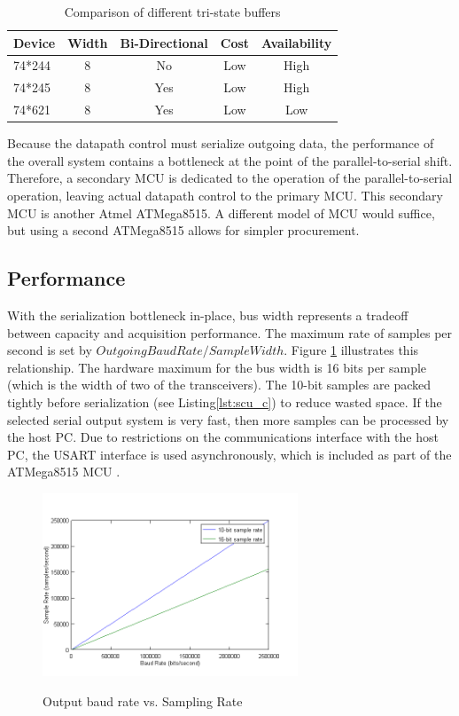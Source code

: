 \begin{table}[bhp]
\caption[Buffer Comparison]{Comparison of different tri-state buffers}
\small
\begin{center}
\begin{tabular}{l| c c c c}
\setlength{\tabcolsep}{1pt}
	Device & Width & Bi-Directional & Cost & Availability \\\hline
	74*244 & 8     & No             & Low  & High\\
	74*245 & 8     & Yes            & Low  & High\\
	74*621 & 8     & Yes            & Low  & Low
\end{tabular}
\end{center}
\label{tab:buffer comparison}
\end{table}

Because the datapath control must serialize outgoing data, the performance
of the overall system contains a bottleneck at the point of the 
parallel-to-serial shift. Therefore, a secondary MCU is dedicated to
the operation of the parallel-to-serial operation, leaving actual datapath 
control to the primary MCU. This secondary MCU is another Atmel ATMega8515. A
different model of MCU would suffice, but using a second ATMega8515 allows  
for simpler procurement.

\subsection{Performance}
With the serialization bottleneck in-place, bus width represents a tradeoff 
between capacity and acquisition performance. The maximum rate of samples per
second is set by ${Outgoing Baud Rate}/{Sample Width}$. Figure \ref{fig:baud rates and sample} 
illustrates this relationship. The hardware maximum for the bus width is 16 bits
per sample (which is the width of two of the transceivers). The 10-bit samples
are packed tightly before serialization (see Listing\ref{lst:scu_c}) to reduce
 wasted space. If the selected serial output system is very fast, then more 
samples can be processed by the host PC. Due to restrictions on the 
communications interface with the host PC, the USART  interface 
is used asynchronously, which is included as part of the ATMega8515 MCU
\cite{ds:ATMEGA8515}.

\begin{figure}[hbp]
\caption[Baud Rate and Samples]{Output baud rate vs. Sampling Rate\cite{ds:ATMEGA8515}}
\includegraphics[width=3in]{baud_rate.png}
\label{fig:baud rates and sample}
\end{figure}
